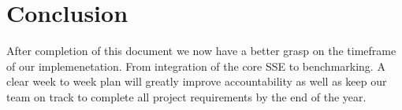 
    
    
    


\section{ Conclusion }
After completion of this document we now have a better grasp on the timeframe of our implemenetation. From integration of the core SSE to benchmarking. A clear week to week plan will greatly improve accountability as well as keep our team on track to complete all project requirements by the end of the year.

